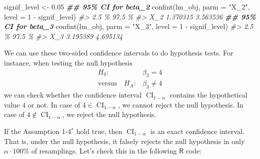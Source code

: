 \documentclass[
  14pt,
]{memoir}
\newenvironment{Shaded}{\begin{snugshade}}{\end{snugshade}}
\newcommand{\AttributeTok}[1]{\textcolor[rgb]{0.77,0.63,0.00}{#1}}
\newcommand{\CommentTok}[1]{\textcolor[rgb]{0.56,0.35,0.01}{\textit{#1}}}
\newcommand{\DecValTok}[1]{\textcolor[rgb]{0.00,0.00,0.81}{#1}}
\newcommand{\DocumentationTok}[1]{\textcolor[rgb]{0.56,0.35,0.01}{\textbf{\textit{#1}}}}
\newcommand{\FloatTok}[1]{\textcolor[rgb]{0.00,0.00,0.81}{#1}}
\newcommand{\FunctionTok}[1]{\textcolor[rgb]{0.00,0.00,0.00}{#1}}
\newcommand{\NormalTok}[1]{#1}
\newcommand{\OtherTok}[1]{\textcolor[rgb]{0.56,0.35,0.01}{#1}}
\newcommand{\SpecialCharTok}[1]{\textcolor[rgb]{0.00,0.00,0.00}{#1}}
\newcommand{\StringTok}[1]{\textcolor[rgb]{0.31,0.60,0.02}{#1}}
\begin{document}
\begin{Shaded}
\begin{Highlighting}[]
\NormalTok{signif\_level }\OtherTok{\textless{}{-}} \FloatTok{0.05}
\DocumentationTok{\#\# 95\% CI for beta\_2}
\FunctionTok{confint}\NormalTok{(lm\_obj, }\AttributeTok{parm =} \StringTok{"X\_2"}\NormalTok{, }\AttributeTok{level =} \DecValTok{1} \SpecialCharTok{{-}}\NormalTok{ signif\_level)}
\CommentTok{\#\textgreater{}        2.5 \%   97.5 \%}
\CommentTok{\#\textgreater{} X\_2 1.370315 3.563536}
\DocumentationTok{\#\# 95\% CI for beta\_3 }
\FunctionTok{confint}\NormalTok{(lm\_obj, }\AttributeTok{parm =} \StringTok{"X\_3"}\NormalTok{, }\AttributeTok{level =} \DecValTok{1} \SpecialCharTok{{-}}\NormalTok{ signif\_level)}
\CommentTok{\#\textgreater{}        2.5 \%   97.5 \%}
\CommentTok{\#\textgreater{} X\_3 3.195389 4.695134}
\end{Highlighting}
\end{Shaded}

We can use these two-sided confidence intervals to do hypothesis tests. For instance, when testing the null hypothesis
\begin{align*}
H_0:&\beta_3=4\\
\text{versus}\quad H_A: &\beta_3\neq 4
\end{align*}
we can check whether the confidence interval \(\operatorname{CI}_{1-\alpha}\) contains the hypothetical value \(4\) or not. In case of \(4\in \operatorname{CI}_{1-\alpha}\), we cannot reject the null hypothesis. In case of \(4\not\in \operatorname{CI}_{1-\alpha}\), we reject the null hypothesis.

If the Assumption 1-4\(^\ast\) hold true, then \(\operatorname{CI}_{1-\alpha}\) is an exact confidence interval. That is, under the null hypothesis, it falsely rejects the null hypothesis in only \(\alpha\cdot 100\%\) of resamplings. Let's check this in the following \(\textsf{R}\) code:
\end{document}
